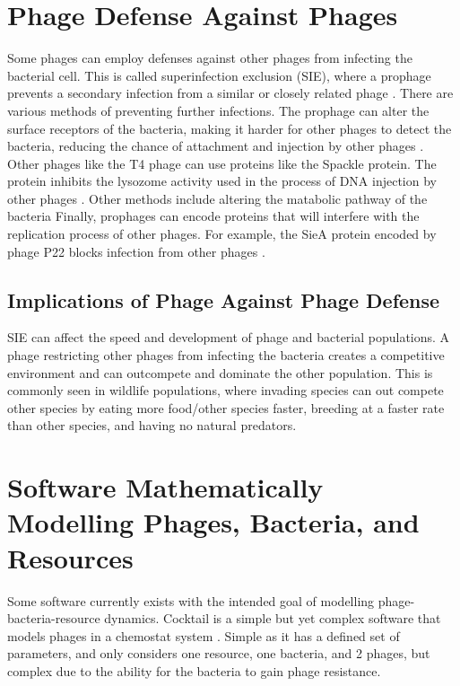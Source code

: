\section{Phage Defense Against Phages}
Some phages can employ defenses against other phages from infecting the bacterial cell. 
This is called superinfection exclusion (SIE), where a prophage prevents a secondary infection from a similar or closely related phage \cite{patelAntiphageDefenceInhibition2024}. 
There are various methods of preventing further infections. 
The prophage can alter the surface receptors of the bacteria, making it harder for other phages to detect the bacteria, reducing the chance of attachment and injection by other phages \cite{bucherPhageMachineSIEence2024}. 
Other phages like the T4 phage can use proteins like the Spackle protein. 
The protein inhibits the lysozome activity used in the process of DNA injection by other phages \cite{bucherPhageMachineSIEence2024, kanamaruStructureFunctionT42020}. 
Other methods include altering the matabolic pathway of the bacteria
Finally, prophages can encode proteins that will interfere with the replication process of other phages. 
For example, the SieA protein encoded by phage P22 blocks infection from other phages \cite{leavittBacteriophageP22SieAmediated2024}. 

\subsection{Implications of Phage Against Phage Defense}
SIE can affect the speed and development of phage and bacterial populations. A phage restricting other phages from infecting the bacteria creates a competitive environment and can outcompete and dominate the other population. 
This is commonly seen in wildlife populations, where invading species can out compete other species by eating more food/other species faster, breeding at a faster rate than other species, and having no natural predators. 

\section{Software Mathematically Modelling Phages, Bacteria, and Resources}
Some software currently exists with the intended goal of modelling phage-bacteria-resource dynamics. 
Cocktail is a simple but yet complex software that models phages in a chemostat system \cite{nilssonCocktailComputerProgram2022}. 
Simple as it has a defined set of parameters, and only considers one resource, one bacteria, and 2 phages, but complex due to the ability for the bacteria to gain phage resistance. 

